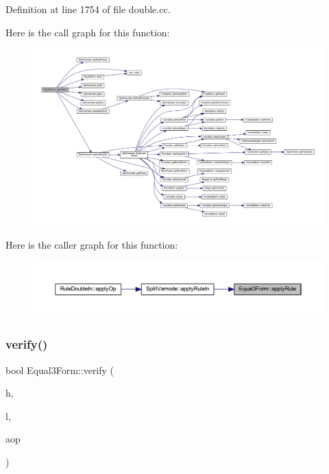 Definition at line 1754 of file double.\+cc.

Here is the call graph for this function\+:
\nopagebreak
\begin{figure}[H]
\begin{center}
\leavevmode
\includegraphics[width=350pt]{class_equal3_form_acfce848b702f6d1a5f7539a7975106a2_cgraph}
\end{center}
\end{figure}
Here is the caller graph for this function\+:
\nopagebreak
\begin{figure}[H]
\begin{center}
\leavevmode
\includegraphics[width=350pt]{class_equal3_form_acfce848b702f6d1a5f7539a7975106a2_icgraph}
\end{center}
\end{figure}
\mbox{\label{class_equal3_form_a42fb0cf61a43874fa11a7087a1877eec}} 
\subsubsection{\texorpdfstring{verify()}{verify()}}
{\footnotesize\ttfamily bool Equal3\+Form\+::verify (\begin{DoxyParamCaption}\item[{\mbox{\hyperlink{class_varnode}{Varnode}} $\ast$}]{h,  }\item[{\mbox{\hyperlink{class_varnode}{Varnode}} $\ast$}]{l,  }\item[{\mbox{\hyperlink{class_pcode_op}{Pcode\+Op}} $\ast$}]{aop }\end{DoxyParamCaption})}



